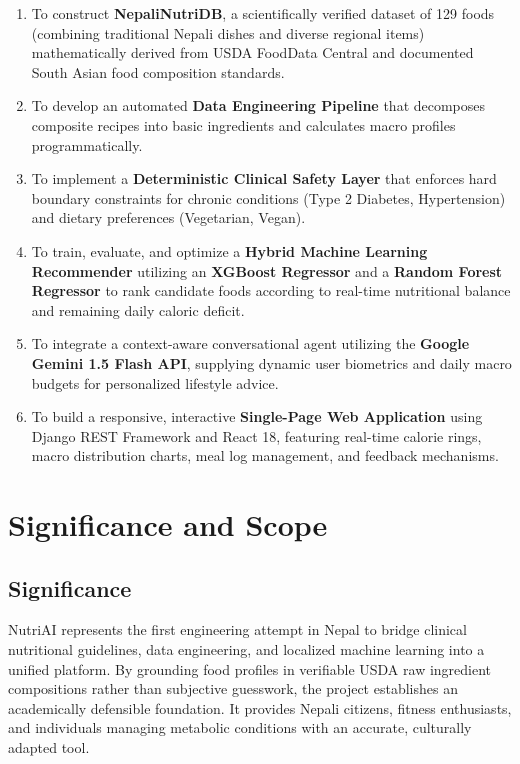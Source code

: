 \documentclass[12pt,a4paper]{report}
\begin{document}
\begin{enumerate}[leftmargin=*]
  \item To construct \textbf{NepaliNutriDB}, a scientifically verified dataset of 129 foods (combining traditional Nepali dishes and diverse regional items) mathematically derived from USDA FoodData Central and documented South Asian food composition standards.
  \item To develop an automated \textbf{Data Engineering Pipeline} that decomposes composite recipes into basic ingredients and calculates macro profiles programmatically.
  \item To implement a \textbf{Deterministic Clinical Safety Layer} that enforces hard boundary constraints for chronic conditions (Type 2 Diabetes, Hypertension) and dietary preferences (Vegetarian, Vegan).
  \item To train, evaluate, and optimize a \textbf{Hybrid Machine Learning Recommender} utilizing an \textbf{XGBoost Regressor} and a \textbf{Random Forest Regressor} to rank candidate foods according to real-time nutritional balance and remaining daily caloric deficit.
  \item To integrate a context-aware conversational agent utilizing the \textbf{Google Gemini 1.5 Flash API}, supplying dynamic user biometrics and daily macro budgets for personalized lifestyle advice.
  \item To build a responsive, interactive \textbf{Single-Page Web Application} using Django REST Framework and React 18, featuring real-time calorie rings, macro distribution charts, meal log management, and feedback mechanisms.
\end{enumerate}

\section{Significance and Scope}

\subsection{Significance}
NutriAI represents the first engineering attempt in Nepal to bridge clinical nutritional guidelines, data engineering, and localized machine learning into a unified platform. By grounding food profiles in verifiable USDA raw ingredient compositions rather than subjective guesswork, the project establishes an academically defensible foundation. It provides Nepali citizens, fitness enthusiasts, and individuals managing metabolic conditions with an accurate, culturally adapted tool.
\end{document}

